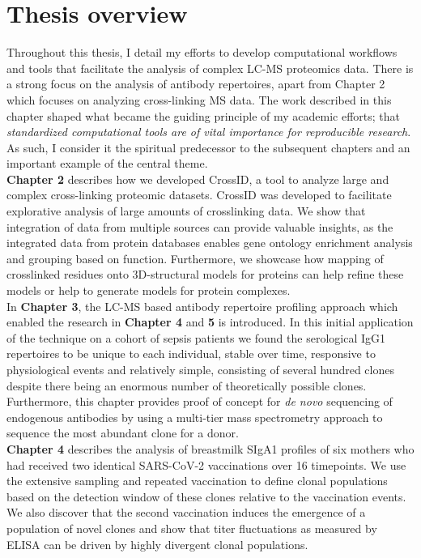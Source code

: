 \section{Thesis overview}
Throughout this thesis, I detail my efforts to develop computational workflows and tools that facilitate the analysis of complex LC-MS proteomics data. There is a strong focus on the analysis of antibody repertoires, apart from Chapter 2 which focuses on analyzing cross-linking MS data. The work described in this chapter shaped what became the guiding principle of my academic efforts; that \emph{standardized computational tools are of vital importance for reproducible research}. As such, I consider it the spiritual predecessor to the subsequent chapters and an important example of the central theme.
\bigskip\\
\textbf{Chapter 2} describes how we developed CrossID, a tool to analyze large and complex cross-linking proteomic datasets. CrossID was developed to facilitate explorative analysis of large amounts of crosslinking data. We show that integration of data from multiple sources can provide valuable insights, as the integrated data from protein databases enables gene ontology enrichment analysis and grouping based on function. Furthermore, we showcase how mapping of crosslinked residues onto 3D-structural models for proteins can help refine these models or help to generate models for protein complexes.
\bigskip\\
In \textbf{Chapter 3}, the LC-MS based antibody repertoire profiling approach which enabled the research in \textbf{Chapter 4} and \textbf{5} is introduced. In this initial application of the technique on a cohort of sepsis patients we found the serological IgG1 repertoires to be unique to each individual, stable over time, responsive to physiological events and relatively simple, consisting of several hundred clones despite there being an enormous number of theoretically possible clones. Furthermore, this chapter provides proof of concept for \emph{de novo} sequencing of endogenous antibodies by using a multi-tier mass spectrometry approach to sequence the most abundant clone for a donor.
\bigskip\\
\textbf{Chapter 4} describes the analysis of breastmilk SIgA1 profiles of six mothers who had received two identical SARS-CoV-2 vaccinations over 16 timepoints. We use the extensive sampling and repeated vaccination to define clonal populations based on the detection window of these clones relative to the vaccination events. We also discover that the second vaccination induces the emergence of a population of novel clones and show that titer fluctuations as measured by ELISA can be driven by highly divergent clonal populations.
